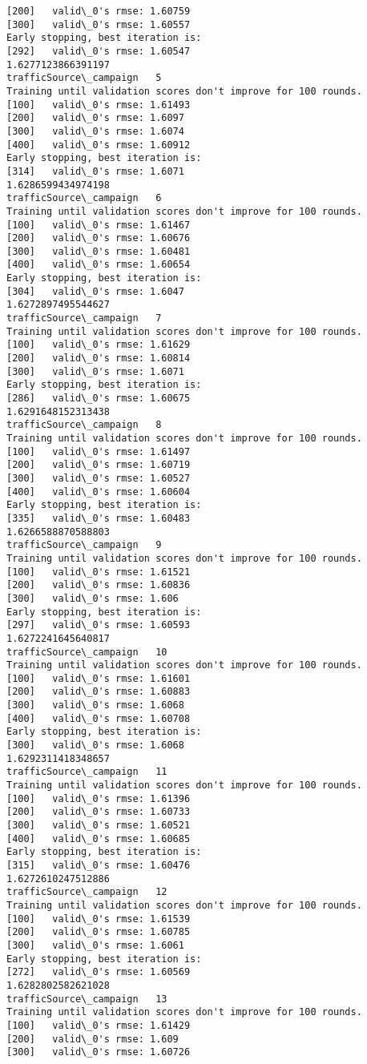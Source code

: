 \documentclass[11pt]{article}
\begin{document}
\begin{Verbatim}[commandchars=\\\{\}]
[200]	valid\_0's rmse: 1.60759
[300]	valid\_0's rmse: 1.60557
Early stopping, best iteration is:
[292]	valid\_0's rmse: 1.60547
1.6277123866391197
trafficSource\_campaign   5
Training until validation scores don't improve for 100 rounds.
[100]	valid\_0's rmse: 1.61493
[200]	valid\_0's rmse: 1.6097
[300]	valid\_0's rmse: 1.6074
[400]	valid\_0's rmse: 1.60912
Early stopping, best iteration is:
[314]	valid\_0's rmse: 1.6071
1.6286599434974198
trafficSource\_campaign   6
Training until validation scores don't improve for 100 rounds.
[100]	valid\_0's rmse: 1.61467
[200]	valid\_0's rmse: 1.60676
[300]	valid\_0's rmse: 1.60481
[400]	valid\_0's rmse: 1.60654
Early stopping, best iteration is:
[304]	valid\_0's rmse: 1.6047
1.6272897495544627
trafficSource\_campaign   7
Training until validation scores don't improve for 100 rounds.
[100]	valid\_0's rmse: 1.61629
[200]	valid\_0's rmse: 1.60814
[300]	valid\_0's rmse: 1.6071
Early stopping, best iteration is:
[286]	valid\_0's rmse: 1.60675
1.6291648152313438
trafficSource\_campaign   8
Training until validation scores don't improve for 100 rounds.
[100]	valid\_0's rmse: 1.61497
[200]	valid\_0's rmse: 1.60719
[300]	valid\_0's rmse: 1.60527
[400]	valid\_0's rmse: 1.60604
Early stopping, best iteration is:
[335]	valid\_0's rmse: 1.60483
1.6266588870588803
trafficSource\_campaign   9
Training until validation scores don't improve for 100 rounds.
[100]	valid\_0's rmse: 1.61521
[200]	valid\_0's rmse: 1.60836
[300]	valid\_0's rmse: 1.606
Early stopping, best iteration is:
[297]	valid\_0's rmse: 1.60593
1.6272241645640817
trafficSource\_campaign   10
Training until validation scores don't improve for 100 rounds.
[100]	valid\_0's rmse: 1.61601
[200]	valid\_0's rmse: 1.60883
[300]	valid\_0's rmse: 1.6068
[400]	valid\_0's rmse: 1.60708
Early stopping, best iteration is:
[300]	valid\_0's rmse: 1.6068
1.6292311418348657
trafficSource\_campaign   11
Training until validation scores don't improve for 100 rounds.
[100]	valid\_0's rmse: 1.61396
[200]	valid\_0's rmse: 1.60733
[300]	valid\_0's rmse: 1.60521
[400]	valid\_0's rmse: 1.60685
Early stopping, best iteration is:
[315]	valid\_0's rmse: 1.60476
1.6272610247512886
trafficSource\_campaign   12
Training until validation scores don't improve for 100 rounds.
[100]	valid\_0's rmse: 1.61539
[200]	valid\_0's rmse: 1.60785
[300]	valid\_0's rmse: 1.6061
Early stopping, best iteration is:
[272]	valid\_0's rmse: 1.60569
1.6282802582621028
trafficSource\_campaign   13
Training until validation scores don't improve for 100 rounds.
[100]	valid\_0's rmse: 1.61429
[200]	valid\_0's rmse: 1.609
[300]	valid\_0's rmse: 1.60726

\end{Verbatim}
\end{document}
